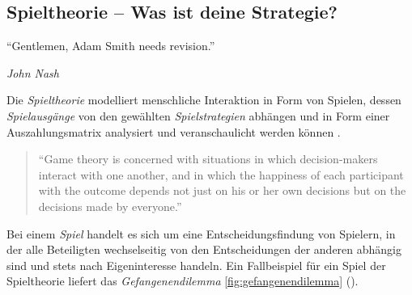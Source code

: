 \subsection{Spieltheorie -- Was ist deine Strategie?}

\epigraph{
		``Gentlemen, Adam Smith needs revision.''}
	{
		\emph{John Nash
	}

Die \emph{Spieltheorie} modelliert menschliche Interaktion in Form von Spielen, dessen \emph{Spielausgänge} von den gewählten \emph{Spielstrategien} abhängen und in Form einer Auszahlungsmatrix analysiert und veranschaulicht werden können \citep[vgl.][153-274]{Kleinberg-2009-oz}.

	\begin{quote}
		``Game theory is concerned with situations in which decision-makers interact with one another, and in which the happiness of each participant with the outcome depends not just on his or her own decisions but on the decisions made by everyone.''
			\citep[vgl.][156]{Kleinberg-2009-oz}
	\end{quote}

Bei einem \emph{Spiel} handelt es sich um eine Entscheidungsfindung von Spielern, in der alle Beteiligten wechselseitig von den Entscheidungen der anderen abhängig sind und stets nach Eigeninteresse handeln.
Ein Fallbeispiel für ein Spiel der Spieltheorie liefert das \emph{Gefangenendilemma} \autoref{fig:gefangenendilemma} ().

}

